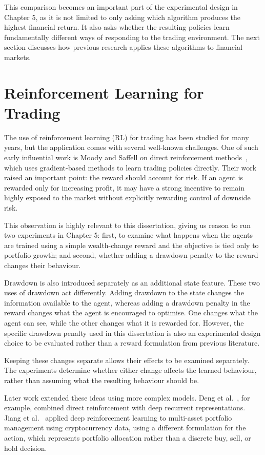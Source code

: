 This comparison becomes an important part of the experimental design in
Chapter 5, as it is not limited to only asking which algorithm produces
the highest financial return. It also asks whether the resulting
policies learn fundamentally different ways of responding to the trading
environment. The next section discusses how previous research applies
these algorithms to financial markets.

\section{Reinforcement Learning for Trading}
The use of reinforcement learning (RL) for trading has been studied for
many years, but the application comes with several well-known
challenges. One of such early influential work is Moody and Saffell on
direct reinforcement methods~\cite{moody2001}, which uses gradient-based methods
to learn trading policies directly. Their work raised an important
point: the reward should account for risk. If an agent is rewarded only
for increasing profit, it may have a strong incentive to remain highly
exposed to the market without explicitly rewarding control of downside
risk.

This observation is highly relevant to this dissertation, giving us
reason to run two experiments in Chapter 5: first, to examine what
happens when the agents are trained using a simple wealth-change reward
and the objective is tied only to portfolio growth; and second, whether
adding a drawdown penalty to the reward changes their behaviour.

Drawdown is also introduced separately as an additional state feature.
These two uses of drawdown act differently. Adding drawdown to the state
changes the information available to the agent, whereas adding a
drawdown penalty in the reward changes what the agent is encouraged to
optimise. One changes what the agent can see, while the other changes
what it is rewarded for. However, the specific drawdown penalty used in
this dissertation is also an experimental design choice to be evaluated
rather than a reward formulation from previous literature.

Keeping these changes separate allows their effects to be examined
separately. The experiments determine whether either change affects the
learned behaviour, rather than assuming what the resulting behaviour
should be.

Later work extended these ideas using more complex models. Deng et al.~\cite{deng2017}, for example, combined direct reinforcement with deep recurrent
representations. Jiang et al.~\cite{jiang2017} applied deep reinforcement
learning to multi-asset portfolio management using cryptocurrency data,
using a different formulation for the action, which represents portfolio
allocation rather than a discrete buy, sell, or hold decision.

